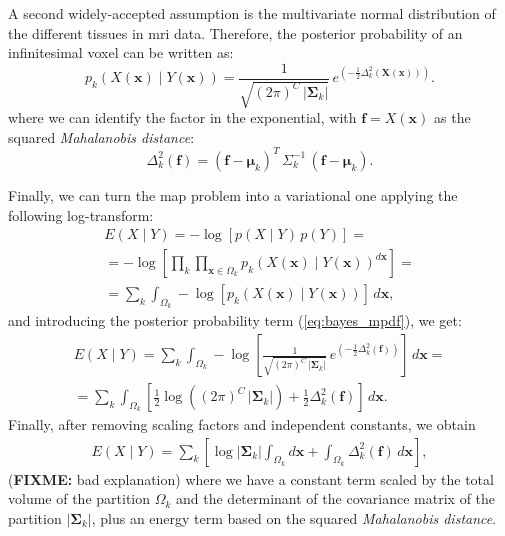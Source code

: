A second widely-accepted assumption is the multivariate normal 
distribution of the different tissues in \gls{mri} data. Therefore,
the posterior probability of an infinitesimal voxel
can be written as:
\begin{equation}
p_k( X(\mathbf{x}) \mid Y(\mathbf{x}) ) = \frac{1}{ \sqrt{(2\pi)^{C}\,\left|\boldsymbol{\Sigma}_{k}\right|}}\,{e^{\left(-\frac{1}{2}  \Delta^2_k (\mathbf{X(\mathbf{x})}) \right)}}.
\label{eq:bayes_mpdf}
\end{equation}
where we can identify the factor in the exponential, with 
$\mathbf{f} = X(\mathbf{x})$ as the squared \emph{Mahalanobis 
distance}:
\begin{equation}
\Delta^2_k (\mathbf{f}) = (\mathbf{f} - \boldsymbol{\mu}_k)^T \, \Sigma^{-1}_k \, (\mathbf{f} - \boldsymbol{\mu}_k).
\label{eq:bayes_mahalanobis}
\end{equation}

Finally, we can turn the \gls{map} problem into a variational one
applying the following log-transform:
\begin{align}
E(X \mid Y)= -\log \left[ p(X \mid Y) \, p(Y) \right] = \\
= -\log \left[ \underset{k}{\prod} \underset{\mathbf{x}\in \Omega_k}{\prod}
p_k( X(\mathbf{x}) \mid Y(\mathbf{x}) )^{d\mathbf{x}} \right] = \\
= \sum\limits_k \int_{\Omega_k} -\log \left[ p_k(X(\mathbf{x}) \mid Y(\mathbf{x} ) ) \right] \, d\mathbf{x},
\label{eq:energy_1}
\end{align}
and introducing the posterior probability term (\autoref{eq:bayes_mpdf}), we get:
\begin{align}
E(X \mid Y) = \sum\limits_k \int_{\Omega_k} -\log \left[ \frac{1}{ \sqrt{(2\pi)^{C}\,\left|\boldsymbol{\Sigma}_{k}\right|}}\,{e^{\left(-\frac{1}{2}  \Delta^2_k (\mathbf{f}) \right)}} \right] \, d\mathbf{x} = \\
= \sum\limits_k \int_{\Omega_k} \left[ \frac{1}{2} \log{ \left( (2\pi)^{C}\,\left|\boldsymbol{\Sigma}_{k}\right| \right)} + \frac{1}{2}  \Delta^2_k (\mathbf{f}) \right] \,d\mathbf{x}.
\end{align}
Finally, after removing scaling factors and independent constants,
we obtain
\begin{align}
E(X \mid Y) = \sum\limits_k \left[ \log{\left|\boldsymbol{\Sigma}_{k}\right|} \int_{\Omega_k} d\mathbf{x} + \int_{\Omega_k} \Delta^2_k (\mathbf{f}) \,d\mathbf{x} \right],
\label{eq:map_energy}
\end{align}
(\textbf{FIXME:} bad explanation) where we have a constant term scaled by
the total volume of the partition $\Omega_k$ and the determinant of the 
covariance matrix of the partition $\left|\boldsymbol{\Sigma}_{k}\right|$,
plus an energy term based on the squared \emph{Mahalanobis distance}.




